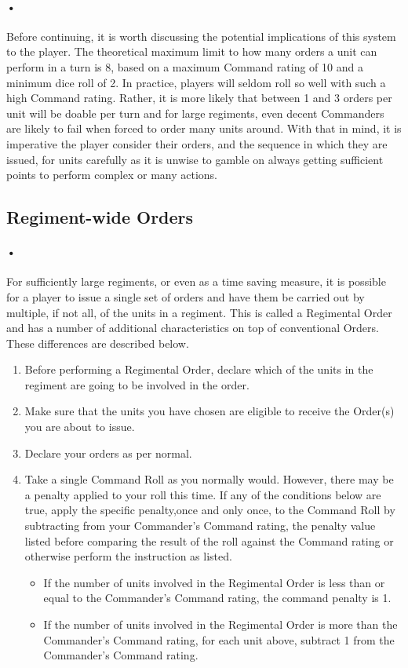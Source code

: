 \documentclass{article}
\begin{document}
\paragraph{•}
Before continuing, it is worth discussing the potential implications of this system to the player. The theoretical maximum limit to how many orders a unit can perform in a turn is 8, based on a maximum Command rating of 10 and a minimum dice roll of 2. In practice, players will seldom roll so well with such a high Command rating. Rather, it is more likely that between 1 and 3 orders per unit will be doable per turn and for large regiments, even decent Commanders are likely to fail when forced to order many units around. With that in mind, it is imperative the player consider their orders, and the sequence in which they are issued, for units carefully as it is unwise to gamble on always getting sufficient points to perform complex or many actions.

\subsection{Regiment-wide Orders}
\paragraph{•}
For sufficiently large regiments, or even as a time saving measure, it is possible for a player to issue a single set of orders and have them be carried out by multiple, if not all, of the units in a regiment. This is called a Regimental Order and has a number of additional characteristics on top of conventional Orders. These differences are described below.

\begin{enumerate}
\item Before performing a Regimental Order, declare which of the units in the regiment are going to be involved in the order. 
\item Make sure that the units you have chosen are eligible to receive the Order(s) you are about to issue.
\item Declare your orders as per normal.
\item Take a single Command Roll as you normally would. However, there may be a penalty applied to your roll this time. If any of the conditions below are true, apply the specific penalty,once and only once, to the Command Roll by subtracting from your Commander's Command rating, the penalty value listed before comparing the result of the roll against the Command rating or otherwise perform the instruction as listed.
	\begin{itemize}
	\item If the number of units involved in the Regimental Order is less than or equal to the Commander's Command rating, the command penalty is 1.
	\item If the number of units involved in the Regimental Order is more than the Commander's Command rating, for each unit above, subtract 1 from the Commander's Command rating.
	\end{itemize}
\end{enumerate}
\end{document}

